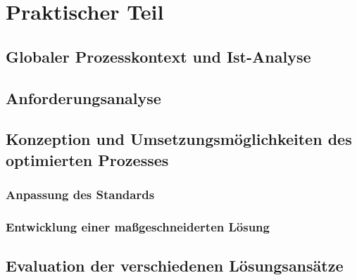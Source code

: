 \chapter{Praktischer Teil}

\section{Globaler Prozesskontext und Ist-Analyse}

\section{Anforderungsanalyse}

\section{Konzeption und Umsetzungsmöglichkeiten des optimierten Prozesses}

\subsection{Anpassung des Standards }

\subsection{Entwicklung einer ma\ss geschneiderten Lösung}

\section{Evaluation der verschiedenen Lösungsansätze}

